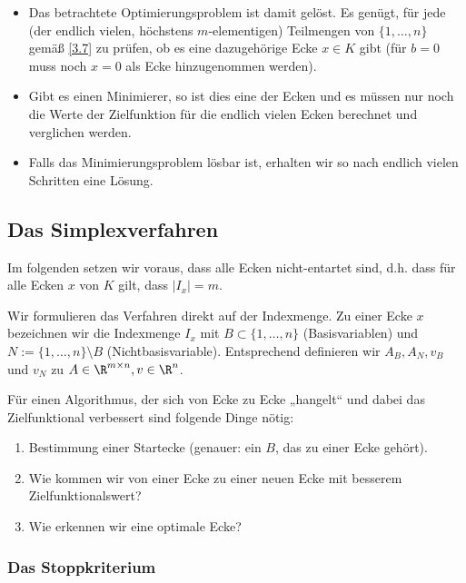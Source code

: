 \begin{nt} \label{3.9}
	\begin{itemize}
		\item
			Das betrachtete Optimierungsproblem ist damit gelöst.
			Es genügt, für jede (der endlich vielen, höchstens $m$-elementigen) Teilmengen von $\{1, \dotsc, n\}$ gemäß \ref{3.7} zu prüfen, ob es eine dazugehörige Ecke $x \in K$ gibt (für $b = 0$ muss noch $x = 0$ als Ecke hinzugenommen werden).
		\item
			Gibt es einen Minimierer, so ist dies eine der Ecken und es müssen nur noch die Werte der Zielfunktion für die endlich vielen Ecken berechnet und verglichen werden.
		\item
			Falls das Minimierungsproblem lösbar ist, erhalten wir so nach endlich vielen Schritten eine Lösung.
	\end{itemize}
\end{nt}


\subsection{Das Simplexverfahren}

Im folgenden setzen wir voraus, dass alle Ecken nicht-entartet sind, d.h. dass für alle Ecken $x$ von $K$ gilt, dass $|I_x| = m$.

Wir formulieren das Verfahren direkt auf der Indexmenge.
Zu einer Ecke $x$ bezeichnen wir die Indexmenge $I_x$ mit $B \subset \{1, \dotsc, n\}$ (Basisvariablen) und $N := \{1, \dotsc, n\} \setminus B$ (Nichtbasisvariable).
Entsprechend definieren wir $A_B, A_N, v_B$ und $v_N$ zu $A \in \R^{m\times n}, v \in \R^n$.

Für einen Algorithmus, der sich von Ecke zu Ecke „hangelt“ und dabei das Zielfunktional verbessert sind folgende Dinge nötig:
\begin{enumerate}[1.]
	\item
		Bestimmung einer Startecke (genauer: ein $B$, das zu einer Ecke gehört).
	\item
		Wie kommen wir von einer Ecke zu einer neuen Ecke mit besserem Zielfunktionalswert?
	\item
		Wie erkennen wir eine optimale Ecke?
\end{enumerate}

\subsubsection{Das Stoppkriterium}

